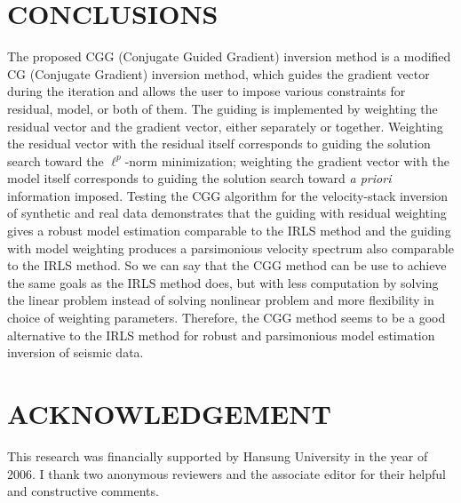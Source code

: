 \section{CONCLUSIONS}
The proposed CGG (Conjugate Guided Gradient) inversion method 
is a modified CG (Conjugate Gradient) inversion method,
which guides the gradient vector during the iteration
and allows the user to impose various constraints for residual, model, or both of them.
The guiding is implemented by weighting the residual vector 
and the gradient vector, either separately or together.
Weighting the residual vector with the residual itself 
corresponds to guiding the solution search toward the $\ell^p$-norm minimization;
weighting the gradient vector with the model itself corresponds to 
guiding the solution search toward {\it a priori} information imposed.
Testing the CGG algorithm for the velocity-stack inversion
of synthetic and real data demonstrates 
that the guiding with residual weighting gives
a robust model estimation comparable to the IRLS method
and the guiding with model weighting produces a parsimonious velocity spectrum
also comparable to the IRLS method.
So we can say that the CGG method can be use to achieve the same goals as the IRLS method does,
but with less computation by solving the linear problem instead of solving nonlinear problem
and more flexibility in choice of weighting parameters.
Therefore, the CGG method seems to be a good alternative to the
IRLS method for robust and parsimonious model estimation inversion of seismic data.

\section{ACKNOWLEDGEMENT}
This research was financially supported by Hansung University in the year of 2006.
I thank two anonymous reviewers and the associate editor for their helpful and constructive comments.




%
